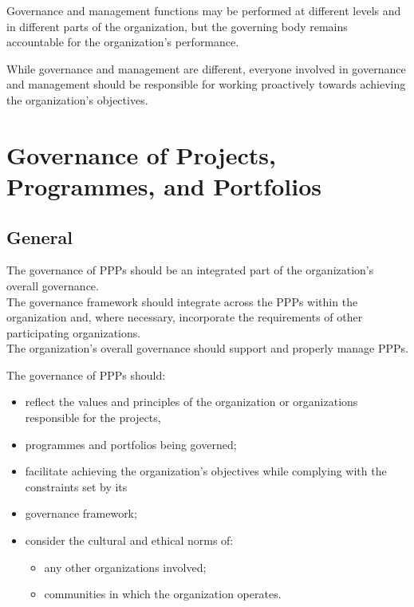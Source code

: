 \documentclass[letterpaper,10pt,english]{jupyterBook}
\begin{document}
\sphinxAtStartPar
Governance and management functions may be performed at different levels and in different parts of the organization, but the governing body remains accountable for the organization’s performance.

\sphinxAtStartPar
While governance and management are different, everyone involved in governance and management should be responsible for working proactively towards achieving the organization’s objectives.


\section{Governance of Projects, Programmes, and Portfolios}
\label{\detokenize{PM/ppm:governance-of-projects-programmes-and-portfolios}}

\subsection{General}
\label{\detokenize{PM/ppm:general}}
\sphinxAtStartPar
The governance of PPPs should be an integrated part of the organization’s overall governance. \\
The governance framework should integrate across the PPPs within the organization and, where necessary, incorporate the requirements of other participating organizations. \\
The organization’s overall governance should support and properly manage PPPs.

\sphinxAtStartPar
The governance of PPPs should:
\begin{itemize}
\item {} 
\sphinxAtStartPar
reflect the values and principles of the organization or organizations responsible for the projects,

\item {} 
\sphinxAtStartPar
programmes and portfolios being governed;

\item {} 
\sphinxAtStartPar
facilitate achieving the organization’s objectives while complying with the constraints set by its

\item {} 
\sphinxAtStartPar
governance framework;

\item {} 
\sphinxAtStartPar
consider the cultural and ethical norms of:
\begin{itemize}
\item {} 
\sphinxAtStartPar
any other organizations involved;

\item {} 
\sphinxAtStartPar
communities in which the organization operates.

\end{itemize}

\end{itemize}
\end{document}
